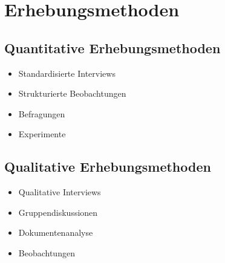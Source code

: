 \documentclass[../main.tex]{subfiles}
\begin{document}
    \section{Erhebungsmethoden}
        \subsection{Quantitative Erhebungsmethoden}
            \begin{itemize}
                \item Standardisierte Interviews
                \item Strukturierte Beobachtungen
                \item Befragungen
                \item Experimente
            \end{itemize}
        
        \subsection{Qualitative Erhebungsmethoden}
            \begin{itemize}
                \item Qualitative Interviews
                \item Gruppendiskussionen
                \item Dokumentenanalyse
                \item Beobachtungen
            \end{itemize}
    
\end{document}
